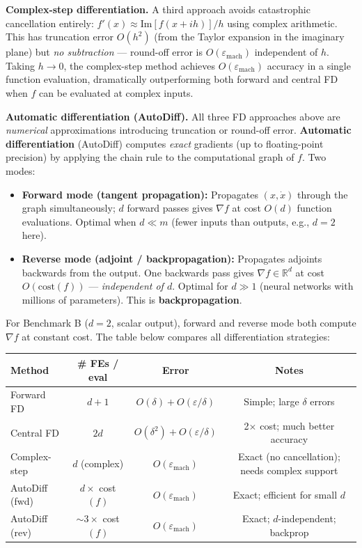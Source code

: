 \documentclass[11pt,a4paper]{article}
\theoremstyle{definition}
\begin{document}
\noindent\textbf{Complex-step differentiation.} A third approach avoids catastrophic cancellation entirely: $f'(x) \approx \text{Im}[f(x + ih)] / h$ using complex arithmetic. This has truncation error $O(h^2)$ (from the Taylor expansion in the imaginary plane) but \emph{no subtraction} --- round-off error is $O(\varepsilon_{\text{mach}})$ independent of $h$. Taking $h \to 0$, the complex-step method achieves $O(\varepsilon_{\text{mach}})$ accuracy in a single function evaluation, dramatically outperforming both forward and central FD when $f$ can be evaluated at complex inputs.

\noindent\textbf{Automatic differentiation (AutoDiff).} All three FD approaches above are \emph{numerical} approximations introducing truncation or round-off error. \textbf{Automatic differentiation} (AutoDiff) computes \emph{exact} gradients (up to floating-point precision) by applying the chain rule to the computational graph of $f$. Two modes:
\begin{itemize}
\item \textbf{Forward mode (tangent propagation):} Propagates $(x, \dot{x})$ through the graph simultaneously; $d$ forward passes gives $\nabla f$ at cost $O(d)$ function evaluations. Optimal when $d \ll m$ (fewer inputs than outputs, e.g., $d = 2$ here).
\item \textbf{Reverse mode (adjoint / backpropagation):} Propagates adjoints backwards from the output. One backwards pass gives $\nabla f \in \mathbb{R}^d$ at cost $O(\text{cost}(f))$ --- \emph{independent of $d$}. Optimal for $d \gg 1$ (neural networks with millions of parameters). This is \textbf{backpropagation}.
\end{itemize}
For Benchmark B ($d = 2$, scalar output), forward and reverse mode both compute $\nabla f$ at constant cost. The table below compares all differentiation strategies:

\begin{center}
\begin{tabular}{lccc}
\toprule
Method & \# FEs / eval & Error & Notes \\
\midrule
Forward FD & $d+1$ & $O(\delta) + O(\varepsilon/\delta)$ & Simple; large $\delta$ errors \\
Central FD & $2d$ & $O(\delta^2) + O(\varepsilon/\delta)$ & 2$\times$ cost; much better accuracy \\
Complex-step & $d$ (complex) & $O(\varepsilon_{\text{mach}})$ & Exact (no cancellation); needs complex support \\
AutoDiff (fwd) & $d \times$ cost$(f)$ & $O(\varepsilon_{\text{mach}})$ & Exact; efficient for small $d$ \\
AutoDiff (rev) & $\sim 3\times$ cost$(f)$ & $O(\varepsilon_{\text{mach}})$ & Exact; $d$-independent; backprop \\
\bottomrule
\end{tabular}
\end{center}
\end{document}
